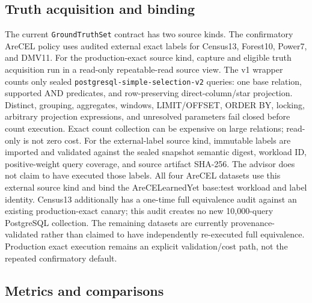 \subsection{Truth acquisition and binding}

The current \texttt{GroundTruthSet} contract has two source kinds. The
confirmatory AreCEL policy uses audited external exact labels for Census13,
Forest10, Power7, and DMV11. For the production-exact source kind, capture and eligible truth acquisition
run in a read-only repeatable-read source view. The v1 wrapper counts only
sealed \texttt{postgresql-simple-selection-}\texttt{v2} queries: one base relation,
supported AND predicates, and row-preserving direct-column/star projection.
Distinct, grouping, aggregates, windows, LIMIT/OFFSET, ORDER BY, locking,
arbitrary projection expressions, and unresolved parameters fail closed before
count execution. Exact count collection can be expensive on large relations;
read-only is not zero cost. For the external-label source kind, immutable labels
are imported and validated against the sealed snapshot semantic digest,
workload ID, positive-weight query coverage, and source artifact SHA-256. The
advisor does not claim to have executed those labels. All four AreCEL datasets
use this external source kind and bind the AreCELearnedYet base:test workload
and label identity. Census13 additionally has a one-time full equivalence audit
against an existing production-exact canary; this audit creates no new
10,000-query PostgreSQL collection. The remaining datasets are currently
provenance-validated rather than claimed to have independently re-executed
full equivalence. Production exact execution remains an explicit
validation/cost path, not the repeated confirmatory default.

\subsection{Metrics and comparisons}

